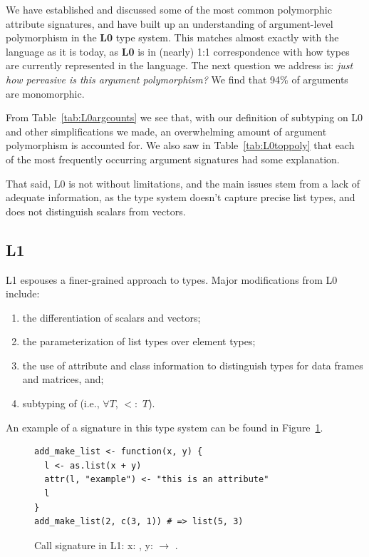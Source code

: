 \documentclass[acmsmall,10pt,review,anonymous]{acmart}\settopmatter{printfolios=true,printccs=false,printacmref=false}
\begin{document}
We have established and discussed some of the most common polymorphic
attribute signatures, and have built up an understanding of argument-level
polymorphism in the {\bf L0} type system.  This matches almost exactly with
the language as it is today, as {\bf L0} is in (nearly) 1:1 correspondence
with how types are currently represented in the language.  The next question
we address is: {\it just how pervasive is this argument polymorphism?}
We find that 94\% of arguments are monomorphic.

From Table~\ref{tab:L0argcounts} we see that, with our definition of
subtyping on L0 and other simplifications we made, an overwhelming amount of
argument polymorphism is accounted for.  We also saw in
Table~\ref{tab:L0toppoly} that each of the most frequently occurring
argument signatures had some explanation.

That said, L0 is not without limitations, and the main issues stem from a
lack of adequate information, as the type system doesn't capture precise
list types, and does not distinguish scalars from vectors. 


%
%
\subsection{L1}

L1 espouses a finer-grained approach to types.  Major modifications from L0
include:

\begin{enumerate}
	\item the differentiation of scalars and vectors;
	\item the parameterization of list types over element types;
	\item the use of attribute and class information to distinguish types for data frames and matrices, and;
	\item subtyping of \sN (i.e., $\forall T$, \sN $<:$ $T$).
\end{enumerate}

An example of a signature in this type system can be found in
Figure~\ref{fig:exL1}.

\begin{figure}[!hb]{\small\begin{lstlisting}[style=R]
add_make_list <- function(x, y) {
  l <- as.list(x + y)
  attr(l, "example") <- "this is an attribute"
  l
}
add_make_list(2, c(3, 1)) # => list(5, 3)
\end{lstlisting}}
\caption{Call signature in L1: x: \sD, y: \D $\rightarrow$ .}\label{fig:exL1}\end{figure}
\end{document}
